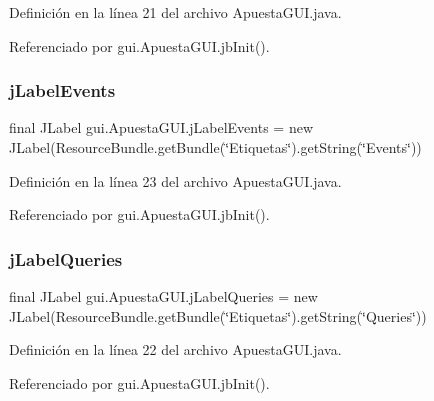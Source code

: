 Definición en la línea 21 del archivo Apuesta\+G\+U\+I.\+java.



Referenciado por gui.\+Apuesta\+G\+U\+I.\+jb\+Init().

\mbox{\label{classgui_1_1ApuestaGUI_a6743a3e782efb0cd456e2cb92e221d8c}} 
\subsubsection{\texorpdfstring{jLabelEvents}{jLabelEvents}}
{\footnotesize\ttfamily final J\+Label gui.\+Apuesta\+G\+U\+I.\+j\+Label\+Events = new J\+Label(Resource\+Bundle.\+get\+Bundle(\char`\"{}Etiquetas\char`\"{}).get\+String(\char`\"{}Events\char`\"{}))\hspace{0.3cm}{\ttfamily [private]}}



Definición en la línea 23 del archivo Apuesta\+G\+U\+I.\+java.



Referenciado por gui.\+Apuesta\+G\+U\+I.\+jb\+Init().

\mbox{\label{classgui_1_1ApuestaGUI_af3501bb228b690c3838ab6c6be176920}} 
\subsubsection{\texorpdfstring{jLabelQueries}{jLabelQueries}}
{\footnotesize\ttfamily final J\+Label gui.\+Apuesta\+G\+U\+I.\+j\+Label\+Queries = new J\+Label(Resource\+Bundle.\+get\+Bundle(\char`\"{}Etiquetas\char`\"{}).get\+String(\char`\"{}Queries\char`\"{}))\hspace{0.3cm}{\ttfamily [private]}}



Definición en la línea 22 del archivo Apuesta\+G\+U\+I.\+java.



Referenciado por gui.\+Apuesta\+G\+U\+I.\+jb\+Init().

\mbox{\label{classgui_1_1ApuestaGUI_a961d928173986250ac0aa7b8f8f2c138}} 
